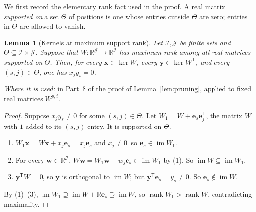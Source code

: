 \documentclass[11pt]{article}
\newtheorem{lemma}[theorem]{Lemma}
\theoremstyle{remark}
\DeclareMathOperator{\rank}{rank}
\DeclareMathOperator{\im}{im}
\newcommand{\R}{\mathbb R}
\newcommand{\tp}{^{\mathsf T}}
\newcommand{\bx}{\mathbf x}
\newcommand{\by}{\mathbf y}
\newcommand{\be}{\mathbf e}
\begin{document}
We first record the elementary rank fact used in the proof. A real matrix
\emph{supported on} a set $\Theta$ of positions is one whose entries outside
$\Theta$ are zero; entries in $\Theta$ are allowed to vanish.

\begin{lemma}[Kernels at maximum support rank]\label{lem:kernel-support}
Let $\mathcal I,\mathcal J$ be finite sets and
$\Theta\subseteq\mathcal I\times\mathcal J$. Suppose that
$W:\R^{\mathcal J}\to\R^{\mathcal I}$ has maximum rank among all real
matrices supported on $\Theta$.
Then, for every $\bx\in\ker W$, every $\by\in\ker W\tp$, and every
$(s,j)\in\Theta$, one has $x_jy_s=0$.
\end{lemma}

\emph{Where it is used:} in Part~8 of the proof of
Lemma~\ref{lem:pruning}, applied to fixed real matrices $W^{p,i}$.

\begin{proof}
Suppose $x_jy_s\ne0$ for some $(s,j)\in\Theta$. Let
$W_1=W+\be_s\be_j\tp$, the matrix $W$ with $1$ added to its $(s,j)$ entry.
It is supported on $\Theta$.
\begin{enumerate}[label=(\arabic*),leftmargin=2em]
\item $W_1\bx=W\bx+x_j\be_s=x_j\be_s$ and $x_j\ne0$, so
$\be_s\in\im W_1$.
\item For every $\mathbf w\in\R^{\mathcal J}$,
$W\mathbf w=W_1\mathbf w-w_j\be_s\in\im W_1$ by (1). So
$\im W\subseteq\im W_1$.
\item $\by\tp W=0$, so $\by$ is orthogonal to $\im W$; but
$\by\tp\be_s=y_s\ne0$. So $\be_s\notin\im W$.
\end{enumerate}
By (1)--(3), $\im W_1\supseteq\im W+\R\be_s\supsetneq\im W$, so
$\rank W_1>\rank W$, contradicting maximality.
\end{proof}
\end{document}
